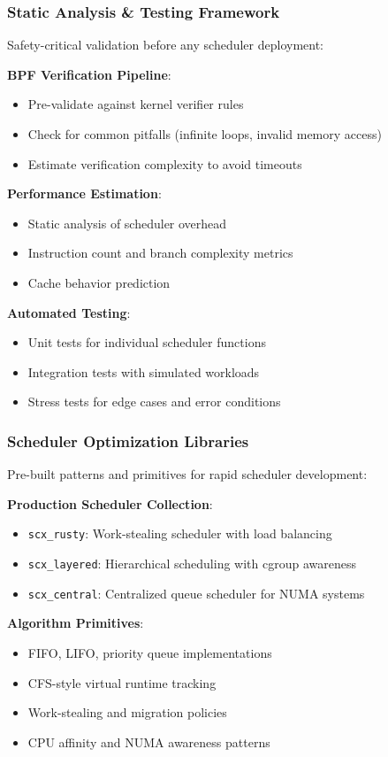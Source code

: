 \subsubsection{Static Analysis \& Testing Framework}
Safety-critical validation before any scheduler deployment:

\textbf{BPF Verification Pipeline}:
\begin{itemize}
\item Pre-validate against kernel verifier rules
\item Check for common pitfalls (infinite loops, invalid memory access)
\item Estimate verification complexity to avoid timeouts
\end{itemize}

\textbf{Performance Estimation}:
\begin{itemize}
\item Static analysis of scheduler overhead
\item Instruction count and branch complexity metrics
\item Cache behavior prediction
\end{itemize}

\textbf{Automated Testing}:
\begin{itemize}
\item Unit tests for individual scheduler functions
\item Integration tests with simulated workloads
\item Stress tests for edge cases and error conditions
\end{itemize}

\subsubsection{Scheduler Optimization Libraries}
Pre-built patterns and primitives for rapid scheduler development:

\textbf{Production Scheduler Collection}:
\begin{itemize}
\item \texttt{scx\_rusty}: Work-stealing scheduler with load balancing
\item \texttt{scx\_layered}: Hierarchical scheduling with cgroup awareness
\item \texttt{scx\_central}: Centralized queue scheduler for NUMA systems
\end{itemize}

\textbf{Algorithm Primitives}:
\begin{itemize}
\item FIFO, LIFO, priority queue implementations
\item CFS-style virtual runtime tracking
\item Work-stealing and migration policies
\item CPU affinity and NUMA awareness patterns
\end{itemize}

